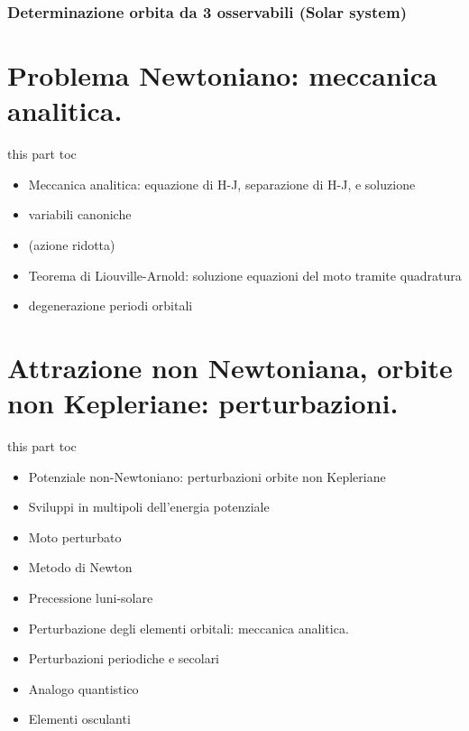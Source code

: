 \documentclass[10pt,xcolor={usenames},fleqn,mathserif,serif]{beamer}
\begin{document}


\section{Determinazione orbita da 3 osservabili (Solar system)}\label{sec:orbitobs}



\part{Problema Newtoniano: meccanica analitica.}\label{part:analytic}
\frame{\partpage}

\begin{frame}{this part toc}

\begin{itemize}

\item Meccanica analitica: equazione di H-J, separazione di H-J, e soluzione
\item variabili canoniche
\item (azione ridotta)
\item Teorema di Liouville-Arnold: soluzione equazioni del moto tramite quadratura
\item degenerazione periodi orbitali

\end{itemize}


\end{frame}



\part{Attrazione non Newtoniana, orbite non Kepleriane: perturbazioni.}\label{part:perturbation}
\frame{\partpage}

\begin{frame}{this part toc}

\begin{itemize}

\item Potenziale non-Newtoniano: perturbazioni orbite non Kepleriane
\item Sviluppi in multipoli dell'energia potenziale
\item Moto perturbato
\item Metodo di Newton
\item Precessione luni-solare
\item Perturbazione degli elementi orbitali: meccanica analitica.
\item Perturbazioni periodiche e secolari
\item Analogo quantistico
\item Elementi osculanti

\end{itemize}

\end{frame} 
\end{document}
